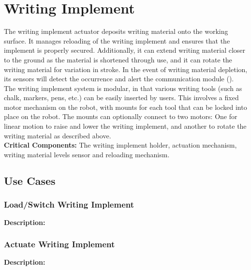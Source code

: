 
\section{Writing Implement}
\label{sec:writing_implement}
The writing implement actuator deposits writing material onto the working surface. It manages reloading of the writing implement and ensures that the implement is properly secured. Additionally, it can extend writing material closer to the ground as the material is shortened through use, and it can rotate the writing material for variation in stroke. In the event of writing material depletion, its sensors will detect the occurrence and alert the communication module (). \\
The writing implement system is modular, in that various writing tools (such as chalk, markers, pens, etc.) can be easily inserted by users. This involves a fixed motor mechanism on the robot, with mounts for each tool that can be locked into place on the robot. The mounts can optionally connect to two motors: One for linear motion to raise and lower the writing implement, and another to rotate the writing material as described above. \\

\noindent
\textbf{Critical Components:} The writing implement holder, actuation mechanism, writing material levels sensor and reloading mechanism. 


\subsection{Use Cases}

\subsubsection{Load/Switch Writing Implement}
\textbf{Description:} 

\subsubsection{Actuate Writing Implement}
\textbf{Description:} 

